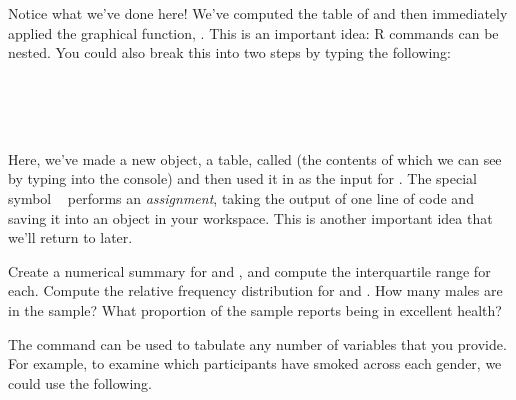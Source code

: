 \documentclass[11pt]{article}
\begin{document}
\ttfamily\noindent
\hlstd{}\hspace*{\fill}\\
\hlstd{}\hlkeyword{(}\hlkeyword{(}\hlkeyword{\usebox{\hlnormalsizeboxdollar}}\hlkeyword{)}\hlkeyword{)}\hspace*{\fill}\\
\normalfont

Notice what we've done here! We've computed the table of \texttt{\hlkeyword{\usebox{\hlnormalsizeboxdollar}}} and then immediately applied the graphical function, \texttt{}. This is an important idea: R commands can be nested. You could also break this into two steps by typing the following:

\ttfamily\noindent
\hlstd{}\hspace*{\fill}\\
\hlstd{}\hlassignement{\usebox{\hlnormalsizeboxlessthan}-}{\ }\hlkeyword{(}\hlkeyword{\usebox{\hlnormalsizeboxdollar}}\hlkeyword{)}\hspace*{\fill}\\
\hlstd{}\hlkeyword{(}\hlkeyword{)}\hspace*{\fill}\\
\normalfont

Here, we've made a new object, a table, called \texttt{} (the contents of which we can see by typing \texttt{} into the console) and then used it in as the input for \texttt{}. The special symbol \texttt{{\ }\hlassignement{\usebox{\hlnormalsizeboxlessthan}-}{\ }} performs an \emph{assignment}, taking the output of one line of code and saving it into an object in your workspace.   This is another important idea that we'll return to later.

\begin{exercise}
Create a numerical summary for \texttt{} and \texttt{}, and compute the interquartile range for each. Compute the relative frequency distribution for \texttt{} and \texttt{}. How many males are in the sample? What proportion of the sample reports being in excellent health?
\end{exercise}

The \texttt{} command can be used to tabulate any number of variables that you provide.  For example, to examine which participants have smoked across each gender, we could use the following.
\end{document}
